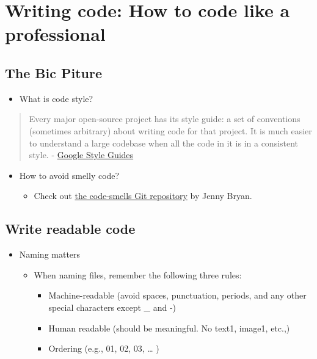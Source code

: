\documentclass[
]{book}
\providecommand{\tightlist}{%
  \setlength{\itemsep}{0pt}\setlength{\parskip}{0pt}}
\begin{document}
\hypertarget{writing-code-how-to-code-like-a-professional}{%
\section{Writing code: How to code like a professional}\label{writing-code-how-to-code-like-a-professional}}

\hypertarget{the-bic-piture}{%
\subsection{The Bic Piture}\label{the-bic-piture}}

\begin{itemize}
\tightlist
\item
  What is code style?
\end{itemize}

\begin{quote}
Every major open-source project has its style guide: a set of conventions (sometimes arbitrary) about writing code for that project. It is much easier to understand a large codebase when all the code in it is in a consistent style. - \href{https://google.GitHub.io/styleguide/}{Google Style Guides}
\end{quote}

\begin{itemize}
\item
  How to avoid smelly code?

  \begin{itemize}
  \tightlist
  \item
    Check out \href{https://GitHub.com/jennybc/code-smells-and-feels\#readme}{the code-smells Git repository} by Jenny Bryan.
  \end{itemize}
\end{itemize}

\hypertarget{write-readable-code}{%
\subsection{Write readable code}\label{write-readable-code}}

\begin{itemize}
\item
  Naming matters

  \begin{itemize}
  \tightlist
  \item
    When naming files, remember the following three rules:

    \begin{itemize}
    \tightlist
    \item
      Machine-readable (avoid spaces, punctuation, periods, and any other special characters except \_ and -)
    \item
      Human readable (should be meaningful. No text1, image1, etc.,)
    \item
      Ordering (e.g., 01, 02, 03, \ldots{} )
    \end{itemize}
  \end{itemize}
\end{itemize}
\end{document}
